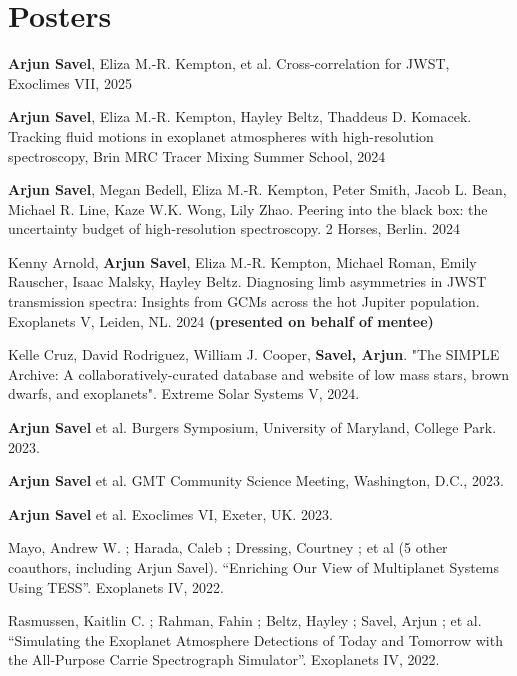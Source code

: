\documentclass[letterpaper,10.5pt]{article}
\newcommand{\resumeSubHeadingListStart}{\begin{itemize}[leftmargin=*]}
\newcommand{\shorterSection}[1]{\vspace{-10pt}\section{#1}}
\begin{document}
\shorterSection{Posters}
\small
  \begin{list}{}{\cvlist}
    \item[{\color{numcolor}\scriptsize14}] \textbf{Arjun Savel}, Eliza M.-R. Kempton, et al. Cross-correlation for JWST, Exoclimes VII, 2025
  \item[{\color{numcolor}\scriptsize13}] \textbf{Arjun Savel}, Eliza M.-R. Kempton, Hayley Beltz, Thaddeus D. Komacek. Tracking fluid motions in exoplanet atmospheres with high-resolution spectroscopy, Brin MRC Tracer Mixing Summer School, 2024
  \item[{\color{numcolor}\scriptsize12}]\textbf{Arjun Savel}, Megan Bedell, Eliza M.-R. Kempton, Peter Smith, Jacob L. Bean, Michael R. Line, Kaze W.K. Wong, Lily Zhao. Peering into the black box: the uncertainty budget of high-resolution spectroscopy. 2 Horses, Berlin. 2024
  \item[{\color{numcolor}\scriptsize11}]Kenny Arnold, \textbf{Arjun Savel}, Eliza M.-R. Kempton, Michael Roman, Emily Rauscher, Isaac Malsky, Hayley Beltz. Diagnosing limb asymmetries in JWST transmission spectra:
 Insights from GCMs across the hot Jupiter population. Exoplanets V, Leiden, NL. 2024 \textbf{(presented on behalf of mentee)}
\item[{\color{numcolor}\scriptsize10}]Kelle Cruz, David Rodriguez, William J. Cooper, \textbf{Savel, Arjun}. "The SIMPLE Archive: A collaboratively-curated database and website of low mass stars, brown dwarfs, and exoplanets". Extreme Solar Systems V, 2024.
  \item[{\color{numcolor}\scriptsize9}]\textbf{Arjun Savel} et al. Burgers Symposium, University of Maryland, College Park. 2023.
  
  \item[{\color{numcolor}\scriptsize8}]\textbf{Arjun Savel} et al. GMT Community Science Meeting, Washington, D.C., 2023.
  
  \item[{\color{numcolor}\scriptsize7}]\textbf{Arjun Savel} et al. Exoclimes VI, Exeter, UK. 2023.

  \item[{\color{numcolor}\scriptsize6}]Mayo, Andrew W. ; Harada, Caleb ; Dressing, Courtney ;  et al (5 other coauthors, including Arjun Savel). ``Enriching Our View of Multiplanet Systems Using TESS''. Exoplanets IV, 2022.

    \item[{\color{numcolor}\scriptsize5}]Rasmussen, Kaitlin C. ; Rahman, Fahin ; Beltz, Hayley ; Savel, Arjun ; et al. ``Simulating the Exoplanet Atmosphere Detections of Today and Tomorrow with the All-Purpose Carrie Spectrograph Simulator''. Exoplanets IV, 2022.
  

\end{list}
\end{document}
